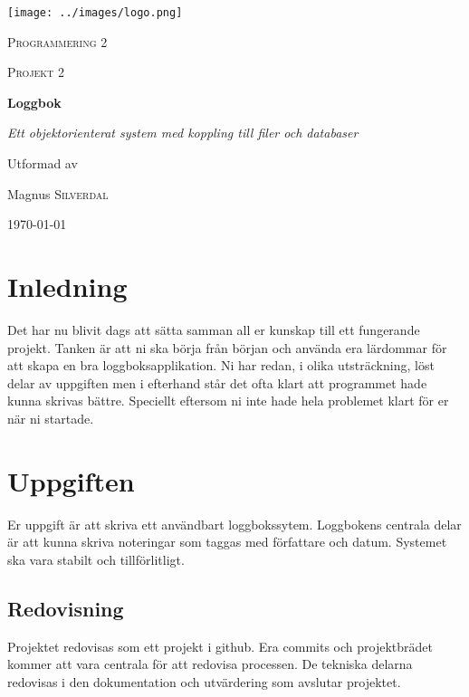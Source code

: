 \documentclass[11pt]{article}
\begin{document}
    \begin{titlepage}
        \centering
        \texttt{[image: ../images/logo.png]}\par\vspace{1cm}
        {\scshape\LARGE Programmering 2 \par}
        \vspace{1cm}
        {\scshape\Large Projekt 2\par}
        \vspace{1.5cm}
        {\huge\bfseries Loggbok\par}
        \vspace{2cm}
        {\Large\itshape Ett objektorienterat system med koppling till filer och databaser\par}
        \vfill
        Utformad av\par
        Magnus \textsc{Silverdal}

        \vfill

        {\large \today\par}
    \end{titlepage}
    \section{Inledning}
        Det har nu blivit dags att sätta samman all er kunskap till ett fungerande projekt. Tanken är att ni ska börja
        från början och använda era lärdommar för att skapa en bra loggboksapplikation. Ni har redan, i  olika utsträckning,
        löst delar av uppgiften men i efterhand står det ofta klart att programmet hade kunna skrivas bättre. Speciellt
        eftersom ni inte hade hela problemet klart för er när ni startade.

    \section{Uppgiften}
        Er uppgift är att skriva ett användbart loggbokssytem. Loggbokens centrala delar är att kunna skriva noteringar som taggas med
        författare och datum. Systemet ska vara stabilt och tillförlitligt.
        \subsection{Redovisning}
            Projektet redovisas som ett projekt i github. Era commits och projektbrädet kommer att vara centrala för att
            redovisa processen. De tekniska delarna redovisas i den dokumentation och utvärdering som avslutar projektet.
\end{document}
